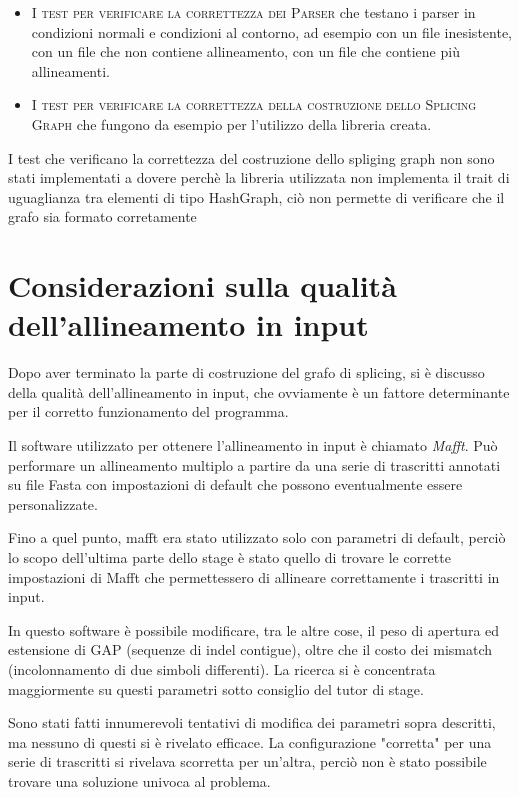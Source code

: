 \begin{itemize}
    \item \textsc{I test per verificare la correttezza dei Parser} che testano i parser in condizioni normali e condizioni al contorno, ad esempio con un file inesistente, con un file che non contiene allineamento, con un file che contiene più allineamenti.
    \item \textsc{I test per verificare la correttezza della costruzione dello Splicing Graph} che fungono da esempio per l'utilizzo della libreria creata.
\end{itemize}

I test che verificano la correttezza del costruzione dello spliging graph non sono stati implementati a dovere perchè la libreria utilizzata non implementa il trait di uguaglianza tra elementi di tipo HashGraph, ciò non permette di verificare che il grafo sia formato corretamente

\newpage

\section{Considerazioni sulla qualità dell'allineamento in input}
Dopo aver terminato la parte di costruzione del grafo di splicing, si è discusso della qualità dell'allineamento in input, che ovviamente è un fattore determinante per il corretto funzionamento del programma.

Il software utilizzato per ottenere l'allineamento in input è chiamato \textit{Mafft}. Può performare un allineamento multiplo a partire da una serie di trascritti annotati su file Fasta con impostazioni di default che possono eventualmente essere personalizzate.

Fino a quel punto, mafft era stato utilizzato solo con parametri di default, perciò lo scopo dell'ultima parte dello stage è stato quello di trovare le corrette impostazioni di Mafft che permettessero di allineare correttamente i trascritti in input.

In questo software è possibile modificare, tra le altre cose, il peso di apertura ed estensione di GAP (sequenze di indel contigue), oltre che il costo dei mismatch (incolonnamento di due simboli differenti). La ricerca si è concentrata maggiormente su questi parametri sotto consiglio del tutor di stage.

Sono stati fatti innumerevoli tentativi di modifica dei parametri sopra descritti, ma nessuno di questi si è rivelato efficace. La configurazione "corretta" per una serie di trascritti si rivelava scorretta per un'altra, perciò non è stato possibile trovare una soluzione univoca al problema.

